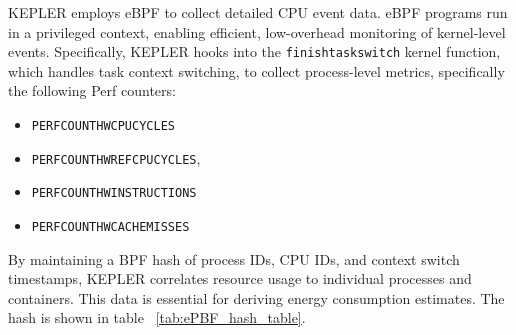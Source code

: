 KEPLER employs eBPF to collect detailed CPU event data. eBPF programs run in a privileged context, enabling efficient, low-overhead monitoring of kernel-level events. Specifically, KEPLER hooks into the \texttt{finish\textunderscore task\textunderscore switch} kernel function, which handles task context switching, to collect process-level metrics, specifically the following Perf counters:
\begin{itemize}
\item \texttt{PERF\textunderscore COUNT\textunderscore HW\textunderscore CPU\textunderscore CYCLES}
\item \texttt{PERF\textunderscore COUNT\textunderscore HW\textunderscore REF\textunderscore CPU\textunderscore CYCLES},
\item \texttt{PERF\textunderscore COUNT\textunderscore HW\textunderscore INSTRUCTIONS}
\item \texttt{PERF\textunderscore COUNT\textunderscore HW\textunderscore CACHE\textunderscore MISSES}
\end{itemize}

By maintaining a BPF hash of process IDs, CPU IDs, and context switch timestamps, KEPLER correlates resource usage to individual processes and containers. This data is essential for deriving energy consumption estimates. The hash is shown in table ~\ref{tab:ePBF_hash_table}.


